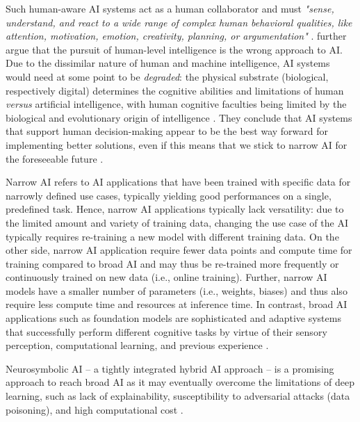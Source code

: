 Such human-aware AI systems act as a human collaborator and must \textit{"sense, understand, and react to a wide
range of complex human behavioral qualities, like attention, motivation, emotion, creativity, planning, or argumentation"}
\citep{kortelingHumanArtificialIntelligence2021}. \cite{kortelingHumanArtificialIntelligence2021} further argue that the
pursuit of human-level intelligence is the wrong approach to AI. Due to the dissimilar nature of human and machine
intelligence, AI systems would need at some point to be \textit{degraded}: the physical substrate (biological,
respectively digital) determines the cognitive abilities and limitations of human \textit{versus} artificial
intelligence, with human cognitive faculties being limited by the biological and evolutionary origin of intelligence
\citep{kortelingHumanArtificialIntelligence2021}. They conclude that AI systems that support human decision-making
appear to be the best way forward for implementing better solutions, even if this means that we stick to narrow AI
 for the foreseeable future \citep{kortelingHumanArtificialIntelligence2021}.

Narrow AI refers to AI applications that have been trained with specific data for narrowly defined use cases,
typically yielding good performances on a single, predefined task. Hence, narrow AI applications typically lack
versatility: due to the limited amount and variety of training data, changing the use case of the AI typically
requires re-training a new model with different training data. On the other side, narrow AI application require fewer
data points and compute time for training compared to broad AI and may thus be re-trained more frequently or continuously
trained on new data (i.e., online training). Further, narrow AI models have a smaller number of parameters (i.e., weights,
biases) and thus also require less compute time and resources at inference time. In contrast, broad AI applications such
as foundation models are sophisticated and adaptive systems that successfully perform different cognitive tasks by virtue
of their sensory perception, computational learning, and previous experience \citep{hochreiterBroadAI2022}. 

Neurosymbolic AI -- a tightly integrated hybrid
AI approach -- is a promising approach to reach broad AI as it may eventually overcome the limitations of deep learning, such
as lack of explainability, susceptibility to adversarial attacks (data poisoning), and high computational cost
\citep{hochreiterBroadAI2022,garcezNeurosymbolicAI3rd2023}.


